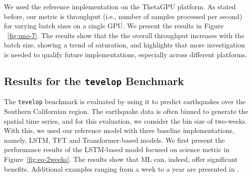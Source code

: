 We used the reference implementation on the ThetaGPU platform. As stated before, our metric is throughput (i.e., number of samples processed per second) for varying batch sizes on a single GPU. We present the results in Figure ~\ref{fig:uno-7}. The results show that the the overall throughput increases with the batch size, showing a trend of saturation, and highlights that more investigation is needed to qualify future implementations, especially across different platforms. 



\subsection{Results for the {\tt tevelop} Benchmark}

The {\tt tevelop} benchmark is evaluated by using it to predict earthquakes over the Southern Californian region.  The earthquake data is often binned to generate the spatial time series, and for this evaluation, we  consider the bin size of two-weeks. With this, we used our reference model  with three baseline implementations, namely, LSTM, TFT and Transformer-based models. We first present the performance results of the LSTM-based model focused on science metric in Figure~\ref{fig:eq-2weeks}. The results show that ML can, indeed, offer significant benefits. Additional examples ranging from a week to a year are presented in \cite{fox2022-jm}.

